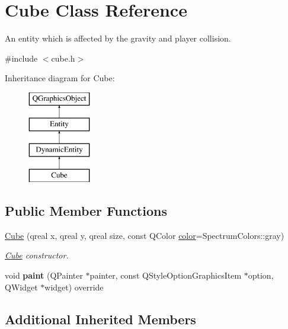\hypertarget{class_cube}{}\section{Cube Class Reference}
\label{class_cube}


An entity which is affected by the gravity and player collision.  




{\ttfamily \#include $<$cube.\+h$>$}

Inheritance diagram for Cube\+:\begin{figure}[H]
\begin{center}
\leavevmode
\includegraphics[height=4.000000cm]{class_cube}
\end{center}
\end{figure}
\subsection*{Public Member Functions}
\begin{DoxyCompactItemize}
\item 
\hyperlink{class_cube_a24a428b741ebf9dfb08bc3635759c147}{Cube} (qreal x, qreal y, qreal size, const Q\+Color \hyperlink{class_entity_ad14bf88ca550e2e5b13438a3faf545e6}{color}=Spectrum\+Colors\+::gray)
\begin{DoxyCompactList}\small\item\em \hyperlink{class_cube}{Cube} constructor. \end{DoxyCompactList}\item 
\mbox{\label{class_cube_a14753b9521923f9e81be843e99aceec5}} 
void {\bfseries paint} (Q\+Painter $\ast$painter, const Q\+Style\+Option\+Graphics\+Item $\ast$option, Q\+Widget $\ast$widget) override
\end{DoxyCompactItemize}
\subsection*{Additional Inherited Members}



